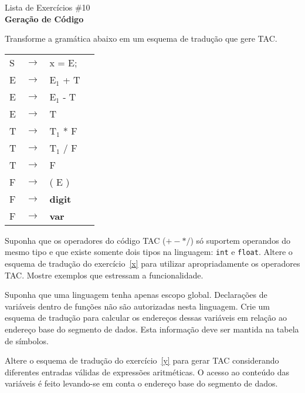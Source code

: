 \documentclass{compiladores}
\begin{document}
\begin{center}
{\LARGE Lista de Exercícios \#10}\\
{\bf Geração de Código}
\end{center}

\bigskip

\begin{listanumerada}
\item \label{x} Transforme a gramática abaixo em um esquema de tradução que gere TAC.

  \begin{tabular}{llll}
    S  &  $\rightarrow$  &  x = E;            \\
    E  &  $\rightarrow$  &  E$_1$ + T         \\
    E  &  $\rightarrow$  &  E$_1$ - T         \\
    E  &  $\rightarrow$  &  T                 \\
    T  &  $\rightarrow$  &  T$_1$ * F         \\
    T  &  $\rightarrow$  &  T$_1$ / F         \\
    T  &  $\rightarrow$  &  F                 \\
    F  &  $\rightarrow$  &  ( E )             \\
    F  &  $\rightarrow$  &  \textbf{digit}    \\
    F  &  $\rightarrow$  &  \textbf{var}    \\
  \end{tabular}

\item Suponha que os operadores do código TAC ($+ - * /$) só suportem
  operandos do mesmo tipo e que existe somente dois tipos na
  linguagem: \texttt{int} e \texttt{float}. Altere o esquema de
  tradução do exercício~\ref{x} para utilizar apropriadamente os
  operadores TAC. Mostre exemplos que estressam a funcionalidade.

\item \label{y} Suponha que uma linguagem tenha apenas escopo
  global. Declarações de variáveis dentro de funções não são
  autorizadas nesta linguagem. Crie um esquema de tradução para
  calcular os endereços dessas variáveis em relação ao endereço base
  do segmento de dados. Esta informação deve ser mantida na tabela de
  símbolos.

\item \label{y1} Altere o esquema de tradução do exercício~\ref{y}
  para gerar TAC considerando diferentes entradas válidas de
  expressões aritméticas. O acesso ao conteúdo das variáveis é feito
  levando-se em conta o endereço base do segmento de dados.


\end{listanumerada}
\end{document}
